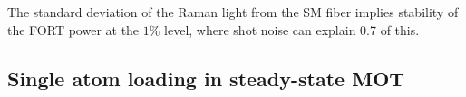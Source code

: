 The standard deviation of the Raman light from the SM fiber implies stability of the FORT power at the $1\%$ level, where shot noise can explain 0.7 of this. 




\subsection{Single atom loading in steady-state MOT}

